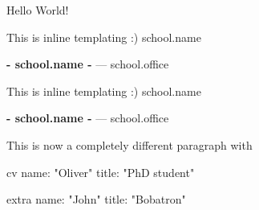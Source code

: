 \documentclass{article}
\begin{document}
Hello World!



\begin{liquid}
This is inline templating :) {{ school.name }}

\sffamily\textbf{ {{- school.name -}} } --- {{ school.office }}
\end{liquid}

\begin{liquid}
This is inline templating :) {{ school.name }}

\sffamily\textbf{ {{- school.name -}} } --- {{ school.office }}
\end{liquid}

\lipsum[2-4]

This is now a completely different paragraph with %

\begin{liquiddata}{cv}
name: "Oliver"
title: "PhD student"
\end{liquiddata}


\begin{liquiddata}{extra}
name: "John"
title: "Bobatron"
\end{liquiddata}

\end{document}
